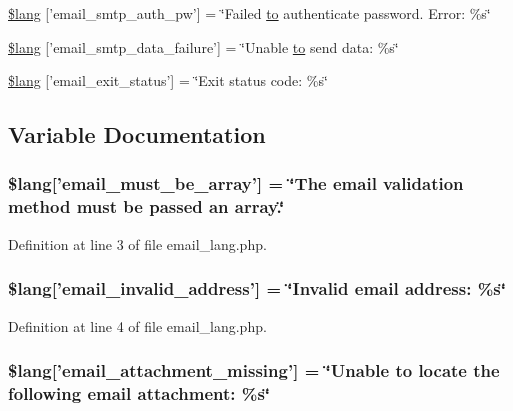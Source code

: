 \begin{DoxyCompactItemize}
\item 
\hyperlink{email__lang_8php_a09fd123f0d251a8eac845f985c6583c3}{\$lang} \mbox{[}'email\-\_\-smtp\-\_\-auth\-\_\-pw'\mbox{]} = \char`\"{}Failed \hyperlink{mathquill_8js_ae3622f38202b3532cd6eae25726945f8}{to} authenticate password. Error\-: \%s\char`\"{}
\item 
\hyperlink{email__lang_8php_a59801e23c2d745400384098c7bf0a6dc}{\$lang} \mbox{[}'email\-\_\-smtp\-\_\-data\-\_\-failure'\mbox{]} = \char`\"{}Unable \hyperlink{mathquill_8js_ae3622f38202b3532cd6eae25726945f8}{to} send data\-: \%s\char`\"{}
\item 
\hyperlink{email__lang_8php_a32b0c2f50acd03defc88df937ee2877f}{\$lang} \mbox{[}'email\-\_\-exit\-\_\-status'\mbox{]} = \char`\"{}Exit status code\-: \%s\char`\"{}
\end{DoxyCompactItemize}


\subsection{Variable Documentation}
\hypertarget{email__lang_8php_ac8c4b077e854bbdbb9a37b2d7f7c47fc}{
\subsubsection[{\$lang}]{\setlength{\rightskip}{0pt plus 5cm}\$lang\mbox{[}'email\-\_\-must\-\_\-be\-\_\-array'\mbox{]} = \char`\"{}The email validation method must be passed an array.\char`\"{}}}\label{email__lang_8php_ac8c4b077e854bbdbb9a37b2d7f7c47fc}


Definition at line 3 of file email\-\_\-lang.\-php.

\hypertarget{email__lang_8php_a37759f6c728f3aaf8df6ca5bb8a3e832}{
\subsubsection[{\$lang}]{\setlength{\rightskip}{0pt plus 5cm}\$lang\mbox{[}'email\-\_\-invalid\-\_\-address'\mbox{]} = \char`\"{}Invalid email address\-: \%s\char`\"{}}}\label{email__lang_8php_a37759f6c728f3aaf8df6ca5bb8a3e832}


Definition at line 4 of file email\-\_\-lang.\-php.

\hypertarget{email__lang_8php_a09c0c415b48ef267bf9e36b555be67d9}{
\subsubsection[{\$lang}]{\setlength{\rightskip}{0pt plus 5cm}\$lang\mbox{[}'email\-\_\-attachment\-\_\-missing'\mbox{]} = \char`\"{}Unable {\bf to} locate the following email attachment\-: \%s\char`\"{}}}\label{email__lang_8php_a09c0c415b48ef267bf9e36b555be67d9}


